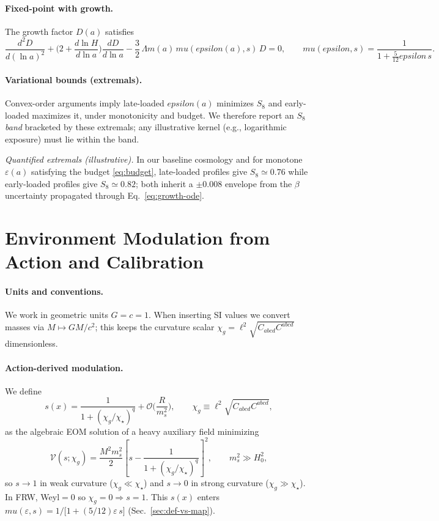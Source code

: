 \documentclass[aps,prd,onecolumn,superscriptaddress,nofootinbib]{revtex4-2}
\def\eps{epsilon}%
\def\mu{mu}%
\def\Omega_\Lambda{OmegaLambda}%
\providecommand{\eps}{\varepsilon}
\providecommand{\be}{\begin{equation}}
\providecommand{\ee}{\end{equation}}
\begin{document}
\paragraph{Fixed-point with growth.}
The growth factor \(D(a)\) satisfies
\be
\label{eq:growth-ode}
\frac{d^2 D}{d(\ln a)^2}
+\Big(2+\frac{d\ln H}{d\ln a}\Big)\frac{dD}{d\ln a}
-\frac{3}{2}\,\Omega_m(a)\,\mu(\eps(a),s)\,D=0,\qquad
\mu(\eps,s)=\frac{1}{1+\tfrac{5}{12}\eps\,s}.
\ee

\paragraph{Variational bounds (extremals).}
Convex-order arguments imply late-loaded \(\eps(a)\) minimizes \(S_8\) and early-loaded maximizes it, under monotonicity and budget. We therefore report an \(S_8\) \emph{band} bracketed by these extremals; any illustrative kernel (e.g., logarithmic exposure) must lie within the band.

\noindent\emph{Quantified extremals (illustrative).} In our baseline cosmology and for monotone \(\varepsilon(a)\) satisfying the budget \eqref{eq:budget}, late-loaded profiles give \(S_8\simeq 0.76\) while early-loaded profiles give \(S_8\simeq 0.82\); both inherit a \(\pm 0.008\) envelope from the \(\beta\) uncertainty propagated through Eq.~\eqref{eq:growth-ode}.

\section{Environment Modulation from Action and Calibration}
\label{sec:env}

\paragraph{Units and conventions.}
We work in geometric units \(G=c=1\). When inserting SI values we convert masses via \(M\mapsto GM/c^2\); this keeps the curvature scalar \(\chi_g=\ell^2\sqrt{C_{abcd}C^{abcd}}\) dimensionless.

\paragraph{Action-derived modulation.}
We define
\be
s(x)=\frac{1}{1+(\chi_g/\chi_\star)^q}+\mathcal O\!\Big(\frac{R}{m_s^2}\Big),\qquad \chi_g\equiv \ell^2\sqrt{C_{abcd}C^{abcd}},
\ee
as the algebraic EOM solution of a heavy auxiliary field minimizing
\be
\mathcal V(s;\chi_g)=\frac{M^2 m_s^2}{2}\left[s-\frac{1}{1+(\chi_g/\chi_\star)^q}\right]^2,\qquad m_s^2\gg H_0^2,
\ee
so \(s\!\to\!1\) in weak curvature (\(\chi_g\!\ll\!\chi_\star\)) and \(s\!\to\!0\) in strong curvature (\(\chi_g\!\gg\!\chi_\star\)). In FRW, Weyl\(=0\) so \(\chi_g=0\Rightarrow s=1\).
This \(s(x)\) enters \(\mu(\varepsilon,s)=1/\!\big[1+(5/12)\varepsilon\,s\big]\) (Sec.~\ref{sec:def-vs-map}).
\end{document}
